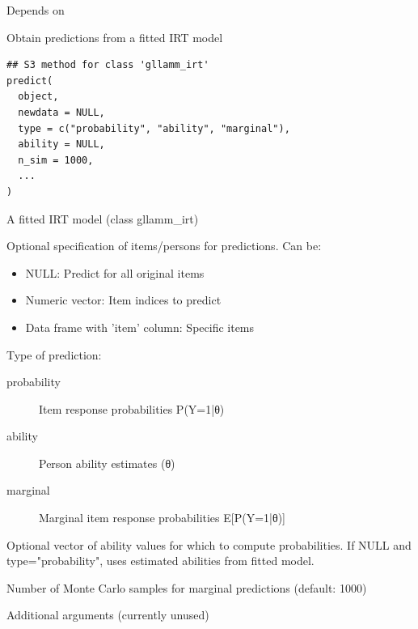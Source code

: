 \documentclass[a4paper]{book}
\begin{document}
%
\begin{Value}
Depends on 
\end{Value}
%
\begin{Description}
Obtain predictions from a fitted IRT model
\end{Description}
%
\begin{Usage}
\begin{verbatim}
## S3 method for class 'gllamm_irt'
predict(
  object,
  newdata = NULL,
  type = c("probability", "ability", "marginal"),
  ability = NULL,
  n_sim = 1000,
  ...
)
\end{verbatim}
\end{Usage}
%
\begin{Arguments}
\begin{ldescription}
\item[\code{object}] A fitted IRT model (class gllamm\_irt)

\item[\code{newdata}] Optional specification of items/persons for predictions.
Can be:
\begin{itemize}

\item{} NULL: Predict for all original items
\item{} Numeric vector: Item indices to predict
\item{} Data frame with 'item' column: Specific items

\end{itemize}


\item[\code{type}] Type of prediction:
\begin{description}

\item[probability] Item response probabilities P(Y=1|θ)
\item[ability] Person ability estimates (θ)
\item[marginal] Marginal item response probabilities E[P(Y=1|θ)]

\end{description}


\item[\code{ability}] Optional vector of ability values for which to compute probabilities.
If NULL and type="probability", uses estimated abilities from fitted model.

\item[\code{n\_sim}] Number of Monte Carlo samples for marginal predictions (default: 1000)

\item[\code{...}] Additional arguments (currently unused)
\end{ldescription}
\end{Arguments}
\end{document}
